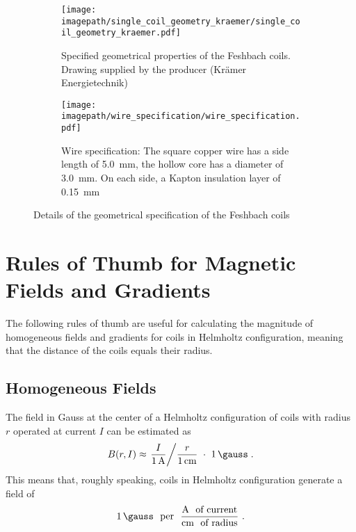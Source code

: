 \begin{figure}
    \centering
    \begin{subfigure}[t]{\textwidth}
        \centering
        \texttt{[image: \\imagepath/single\_coil\_geometry\_kraemer/single\_coil\_geometry\_kraemer.pdf]}
        \caption{Specified geometrical properties of the Feshbach coils. Drawing supplied by the producer (Krämer Energietechnik)}
        \label{fig:single_coil_geometry_kraemer}
    \end{subfigure}
    
    \begin{subfigure}[t]{\textwidth}
        \centering
        \texttt{[image: \\imagepath/wire\_specification/wire\_specification.pdf]}
        \caption{Wire specification: The square copper wire has a side length of \SI{5.0}{\milli\meter}, the hollow core has a diameter of \SI{3.0}{\milli\meter}. On each side, a Kapton insulation layer of \SI{0.15}{\milli\meter} }
        \label{fig:wire_specification}
    \end{subfigure}
    \caption{Details of the geometrical specification of the Feshbach coils}
    \label{fig:coil_geometrical_properties}
\end{figure}



\chapter{Rules of Thumb for Magnetic Fields and Gradients}\label{ch:rules_of_thumb}
The following rules of thumb are useful for calculating the magnitude of homogeneous fields and gradients for coils in Helmholtz configuration, meaning that the distance of the coils equals their radius.

\section*{Homogeneous Fields}
The field in 
Gauss
at the center of a Helmholtz configuration of coils with radius $r$ operated at current $I$ can be estimated as
\begin{align}\label{eq:rot_field}
    B(r, I) \approx \left. \frac{I}{\SI{1}{\ampere}} \middle/ \frac{r}{\SI{1}{\centi\meter}} ~ \cdot ~\SI{1}{\gauss}\right. .
\end{align}
This means that, roughly speaking, coils in  Helmholtz configuration generate a field of
\begin{align}\nonumber
    \SI{1}{\gauss} ~~ \text{per} ~~ \frac{\si{\ampere} ~~ \text{of current}}{\si{\centi\meter} ~~ \text{of radius}}~.
\end{align}

